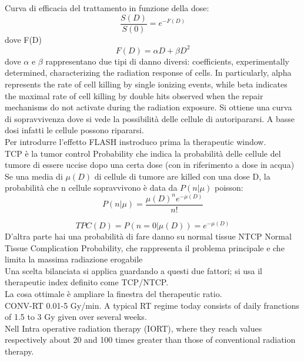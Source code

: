     Curva di efficacia del trattamento in funzione della dose:
    \begin{equation}
        \frac{S(D)}{S(0)}=e^{-F(D)}
    \end{equation} 
    dove F(D)   
    \begin{equation}
        F(D) = \alpha D + \beta D^2
    \end{equation} 
    dove $\alpha$ e $\beta$ rappresentano due tipi di danno diversi: coefficients, experimentally determined, characterizing the
    radiation response of cells. In particularly, alpha represents the rate of cell killing
    by single ionizing events, while beta indicates the maximal rate of cell killing by
    double hits observed when the repair mechanisms do not activate during the
    radiation exposure.
    Si ottiene una curva di sopravvivenza dove si vede la possibilità delle cellule di autoripararsi. A basse dosi infatti le cellule possono ripararsi.\\

    Per introdurre l'effetto FLASH instroduco prima la therapeutic window.  \\

    TCP è la tumor control Probability che indica la probabilità delle cellule del tumore di essere uccise dopo una certa dose (con in riferimento a dose in acqua)\\
    Se una media di $\mu(D)$ di cellule di tumore are killed con una dose D, la probabilità che n cellule sopravvivono è data da $P(n|\mu)$ poisson:
    \begin{equation}
        P(n|\mu) = \frac{\mu(D)^ne^{-\mu(D)}}{n!}
    \end{equation}    

    \begin{equation}
        TPC(D) = P(n=0|\mu(D))= e^{-\mu(D)}
    \end{equation} 
    D'altra parte hai una probabilità di fare danno su normal tissue NTCP Normal Tissue Complication Probability, che rappresenta il problema principale e che limita la massima radiazione erogabile\\
    Una scelta bilanciata si applica guardando a questi due fattori; si usa il therapeutic index definito come TCP/NTCP.\\
    La cosa ottimale è ampliare la finestra del therapeutic ratio.\\


    CONV-RT 0.01-5 Gy/min. A typical RT regime today consists of daily franctions of 1.5 to 3 Gy given over several weeks.\\
    Nell Intra operative radiation therapy (IORT), where they reach values respectively about
    20 and 100 times greater than those of conventional radiation therapy.


